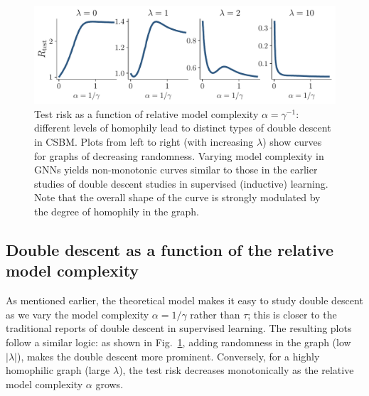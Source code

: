 \documentclass[9pt,twocolumn]{pnas-new}
\begin{document}
\begin{figure}[!h]
    \centering
    \includegraphics[width=\linewidth]{figs_dd.pdf}
    \caption{Test risk as a function of relative model complexity $\alpha = \gamma^{-1}$: different levels of homophily lead to distinct types of double descent in CSBM. Plots from left to right (with increasing $\lambda$) show curves for graphs of decreasing randomness. Varying model complexity in GNNs yields non-monotonic curves similar to those in the earlier studies of double descent studies in supervised (inductive) learning. Note that the overall shape of the curve is strongly modulated by the degree of homophily in the graph.}
    \label{fig: double descent with different alpha}
\end{figure}


\subsection*{Double descent as a function of the relative model complexity} As mentioned earlier, the theoretical model makes it easy to study double descent as we vary the model complexity $\alpha = 1 / \gamma$ rather than $\tau$; this is closer to the traditional reports of double descent in supervised learning. The resulting plots follow a similar logic: as shown in Fig.~\ref{fig: double descent with different alpha}, adding randomness in the graph (low $|\lambda|$), makes the double descent more prominent. Conversely, for a highly homophilic graph (large $\lambda$), the test risk decreases monotonically as the relative model complexity $\alpha$ grows.
\end{document}
